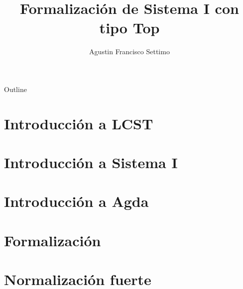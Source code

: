 \documentclass[aspectratio=149]{beamer}
\title{Formalización de Sistema I con tipo Top}
\author{Agustin Francisco Settimo}
\date{}
\begin{document}
	
\begin{frame}[plain]
    \maketitle
\end{frame}

\begin{frame}{Outline}
	\tableofcontents
\end{frame}

\section{Introducción a LCST}

%

\section{Introducción a Sistema I}

%

\section{Introducción a Agda}

\section{Formalización}

%

\section{Normalización fuerte}


\end{document}
